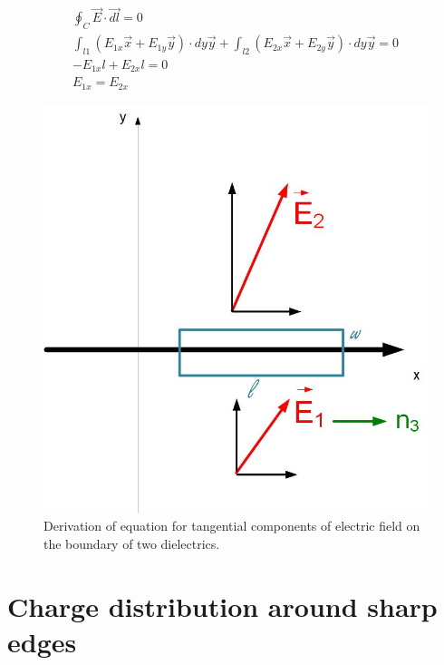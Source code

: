 \documentclass{ximera}
\begin{document}
\begin{eqnarray}
\oint_C \vec{E} \cdot \vec{dl}=0 \\
\int_{l1} (E_{1x} \vec{x}+E_{1y} \vec{y}) \cdot dy \vec{y} +\int_{l2} (E_{2x} \vec{x}+E_{2y} \vec{y}) \cdot dy \vec{y} =0 \\
-E_{1x} l + E_{2x} l = 0 \\
E_{1x}  = E_{2x}
\end{eqnarray}


\begin{figure}[htbp]
\begin{center}
\includegraphics[scale=0.5]{../jpg/BoundaryConditionsTang.jpg}
\end{center}
\caption{Derivation of equation for tangential components of electric field on the boundary of two dielectrics.}
\label{fig:BoundaryConditionTangential}
\end{figure}








\section{Charge distribution around sharp edges}
\end{document}

